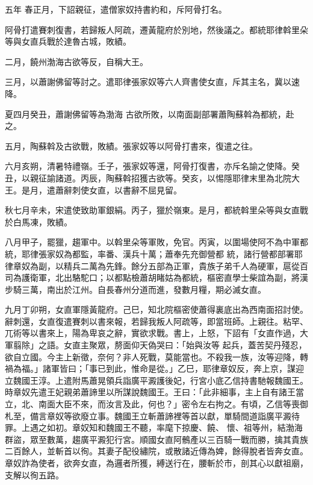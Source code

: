 
\begin{pinyinscope}

 五年
 春正月，下詔親征，遣僧家奴持書約和，斥阿骨打名。



 阿骨打遣賽刺復書，若歸叛人阿疏，遷黃龍府於別地，然後議之。都統耶律斡里朵等與女直兵戰於達魯古城，敗績。



 二月，饒州渤海古欲等反，自稱大王。



 三月，以蕭謝佛留等討之。遣耶律張家奴等六人齊書使女直，斥其主名，冀以速降。



 夏四月癸丑，蕭謝佛留等為渤海
 古欲所敗，以南面副部署蕭陶蘇斡為都統，赴之。



 五月，陶蘇斡及古欲戰，敗績。張家奴等以阿骨打書來，復遣之往。



 六月亥朔，清暑特禮嶺。壬子，張家奴等還，阿骨打復書，亦斥名諭之使降。癸丑，以親征諭諸道。丙辰，陶蘇斡招獲古欲等。癸亥，以惕隱耶律末里為北院大王。是月，遣蕭辭刺使女直，以書辭不屈見留。



 秋七月辛未，宋遣使致助軍銀絹。丙子，獵於嶺東。是月，都統斡里朵等與女直戰於白馬凍，敗績。



 八月甲子，罷獵，趨軍中。以斡里朵等軍敗，免官。丙寅，以圍場使阿不為中軍都統，耶律張家奴為都監，率番、漢兵十萬；蕭奉先充御營都
 統，諸行營都部署耶律章奴為副，以精兵二萬為先鋒。餘分五部為正軍，貴族子弟千人為硬軍，扈從百司為護衛軍，北出駱駝口；以都點檢蕭胡睹姑為都統，樞密直學士柴誼為副，將漢步騎三萬，南出於江州。自長春州分道而進，發數月糧，期必滅女直。



 九月丁卯朔，女直軍隱黃龍府。己巳，知北院樞密使蕭得裏底出為西南面招討使。辭刺還，女直復遣賽刺以書來報，若歸我叛人阿疏等，即當班師。上親往。粘罕、兀術等以書來上，陽為卑哀之辭，實欲求戰。書上，上怒，下詔有「女直作過，大軍翦除」之語。女直主聚眾，剺面仰天偽哭曰：「始與汝等
 起兵，蓋苦契丹殘忍，欲自立國。今主上新徵，奈何？非人死戰，莫能當也。不殺我一族，汝等迎降，轉禍為福。」諸軍皆曰；「事已到此，惟命是從。」乙巳，耶律章奴反，奔上京，謀迎立魏國王淳。上遣附馬蕭晃領兵詣廣平澱護後妃，行宮小底乙信持書馳報魏國王。時章奴先遣王妃親弟蕭諦里以所謀說魏國王。王曰：「此非細事，主上自有諸王當立，北、南面大臣不來，而汝言及此，何也？」密令左右拘之。有頃，乙信等喪御札至，備言章奴等欲廢立事。魏國王立斬蕭諦裡等首以獻，單騎間道詣廣平澱待罪。上遇之如初。章奴知和魏國王不聽，率麾下掠慶、饒、
 懷、祖等州，結渤海群盜，眾至數萬，趨廣平澱犯行宮。順國女直阿鶻產以三百騎一戰而勝，擒其貴族二百餘人，並斬首以徇。其妻子配役繡院，或散諸近傳為婢，餘得脫者皆奔女直。章奴詐為使者，欲奔女直，為邏者所獲，縛送行在，腰斬於市，剖其心以獻祖廟，支解以徇五路。




\end{pinyinscope}
